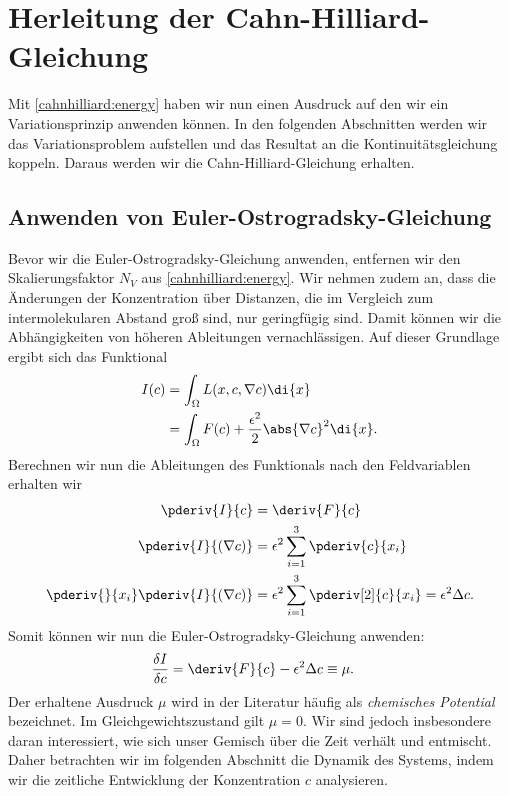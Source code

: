 %
%
%
%
\section{Herleitung der Cahn-Hilliard-Gleichung\label{cahnhilliard:section:herleitung}}
Mit \eqref{cahnhilliard:energy} haben wir nun einen Ausdruck auf den wir ein Variationsprinzip anwenden können.
In den folgenden Abschnitten werden wir das Variationsproblem aufstellen und
das Resultat an die Kontinuitätsgleichung koppeln.
Daraus werden wir die Cahn-Hilliard-Gleichung erhalten.

\subsection{Anwenden von Euler-Ostrogradsky-Gleichung}
Bevor wir die Euler-Ostrogradsky-Gleichung anwenden,
entfernen wir den Skalierungsfaktor $N_V$ aus \eqref{cahnhilliard:energy}.
Wir nehmen zudem an,
dass die Änderungen der Konzentration über Distanzen,
die im Vergleich zum intermolekularen Abstand groß sind,
nur geringfügig sind.
Damit können wir die Abhängigkeiten von höheren Ableitungen vernachlässigen.
Auf dieser Grundlage ergibt sich das Funktional
\begin{align}
I(c)
&=
\int_\Omega L(x, c, \nabla c) \di{x}
\nonumber
\\
&=
\int_\Omega F(c) + \frac{\epsilon^2}{2} \abs{\nabla c}^2 \di{x}.
\end{align}
Berechnen wir nun die Ableitungen des Funktionals nach den Feldvariablen erhalten wir
\begin{align*}
\pderiv{I}{c}
&=
\deriv{F}{c}
\\
\pderiv{I}{(\nabla c)}
&=
\epsilon^2 \sum_{i=1}^3 \pderiv{c}{x_i}
\\
\pderiv{}{x_i}\pderiv{I}{(\nabla c)}
&=
\epsilon^2 \sum_{i=1}^3 \pderiv[2]{c}{x_i}
=
\epsilon^2 \Delta c
.
\end{align*}
Somit können wir nun die Euler-Ostrogradsky-Gleichung anwenden:
\begin{align*}
\frac{\delta I}{\delta c}
&=
\deriv{F}{c} -  \epsilon^2 \Delta c
\equiv
\mu
.
\end{align*}
Der erhaltene Ausdruck $\mu$ wird in der Literatur häufig als
\emph{chemisches Potential} bezeichnet.
Im Gleichgewichtszustand gilt $\mu = 0$.
Wir sind jedoch insbesondere daran interessiert,
wie sich unser Gemisch über die Zeit verhält und entmischt.
Daher betrachten wir im folgenden Abschnitt die Dynamik des Systems,
indem wir die zeitliche Entwicklung der Konzentration
$c$ analysieren.

